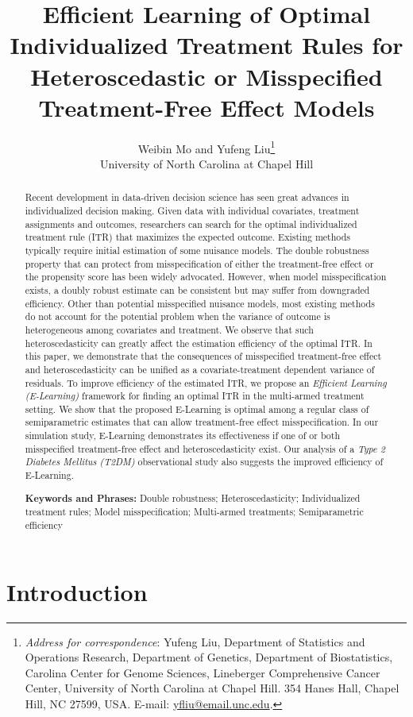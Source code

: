 \documentclass[11pt]{article}
\title{Efficient Learning of Optimal Individualized Treatment Rules for Heteroscedastic or Misspecified Treatment-Free Effect Models}
\author{
	Weibin Mo and Yufeng Liu\thanks{\textit{Address for correspondence}: Yufeng Liu, Department of Statistics and Operations Research, Department of Genetics, Department of Biostatistics, Carolina Center for Genome Sciences, Lineberger Comprehensive Cancer Center, University of North Carolina at Chapel Hill. 354 Hanes Hall, Chapel Hill, NC 27599, USA. E-mail: \href{mailto:yfliu@email.unc.edu}{yfliu@email.unc.edu}.
	} 
	\\ 
	University of North Carolina at Chapel Hill
}
\date{}
\theoremstyle{definition}
\theoremstyle{remark}
\begin{document}
	\maketitle
	\begin{abstract}
		Recent development in data-driven decision science has seen great advances in individualized decision making. Given data with individual covariates, treatment assignments and outcomes, researchers can search for the optimal individualized treatment rule (ITR) that maximizes the expected outcome. Existing methods typically require initial estimation of some nuisance models. The double robustness property that can protect from misspecification of either the treatment-free effect or the propensity score has been widely advocated. However, when model misspecification exists, a doubly robust estimate can be consistent but may suffer from downgraded efficiency. Other than potential misspecified nuisance models, most existing methods do not account for the potential problem when the variance of outcome is heterogeneous among covariates and treatment. We observe that such heteroscedasticity can greatly affect the estimation efficiency of the optimal ITR. In this paper, we demonstrate that the consequences of misspecified treatment-free effect and heteroscedasticity can be unified as a covariate-treatment dependent variance of residuals. To improve efficiency of the estimated ITR, we propose an \textit{Efficient Learning (E-Learning)} framework for finding an optimal ITR in the multi-armed treatment setting. We show that the proposed E-Learning is optimal among a regular class of semiparametric estimates that can allow treatment-free effect misspecification. In our simulation study, E-Learning demonstrates its effectiveness if one of or both misspecified treatment-free effect and heteroscedasticity exist. Our analysis of a \textit{Type 2 Diabetes Mellitus (T2DM)} observational study also suggests the improved efficiency of E-Learning.
		
		\noindent \textbf{Keywords and Phrases:} Double robustness; Heteroscedasticity; Individualized treatment rules; Model misspecification; Multi-armed treatments; Semiparametric efficiency
	\end{abstract}
	
	\newpage
	
\section{Introduction}
\end{document}
